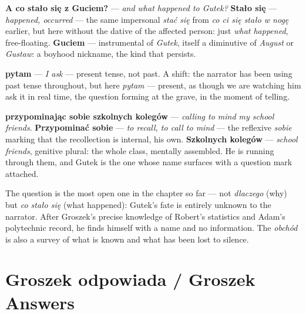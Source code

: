 

\textbf{A co stało się z Guciem?} --- \textit{and what happened
to Gutek?} \textbf{Stało się} --- \textit{happened, occurred}
--- the same impersonal \textit{stać się} from \textit{co ci się
stało w nogę} earlier, but here without the dative of the
affected person: just \textit{what happened}, free-floating.
\textbf{Guciem} --- instrumental of \textit{Gutek}, itself a
diminutive of \textit{August} or \textit{Gustaw}: a boyhood
nickname, the kind that persists.

\textbf{pytam} --- \textit{I ask} --- present tense, not past.
A shift: the narrator has been using past tense throughout, but
here \textit{pytam} --- present, as though we are watching him
ask it in real time, the question forming at the grave, in the
moment of telling.

\textbf{przypominając sobie szkolnych kolegów} --- \textit{calling
to mind my school friends}. \textbf{Przypominać sobie} ---
\textit{to recall, to call to mind} --- the reflexive
\textit{sobie} marking that the recollection is internal, his
own. \textbf{Szkolnych kolegów} --- \textit{school friends},
genitive plural: the whole class, mentally assembled. He is
running through them, and Gutek is the one whose name surfaces
with a question mark attached.

\medskip
The question is the most open one in the chapter so far --- not
\textit{dlaczego} (why) but \textit{co stało się} (what
happened): Gutek's fate is entirely unknown to the narrator.
After Groszek's precise knowledge of Robert's statistics and
Adam's polytechnic record, he finds himself with a name and no
information. The \textit{obchód} is also a survey of what is
known and what has been lost to silence.

\section{Groszek odpowiada / Groszek Answers}


